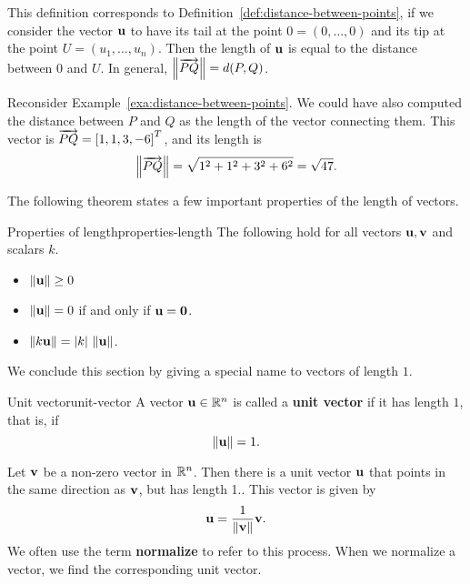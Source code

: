 This definition corresponds to
Definition~\ref{def:distance-between-points}, if we consider the
vector $\mbox{\bf u}$ to have its tail at the point
$0 = (0,\ldots,0)$ and its tip at the point
$U = (u_1,\ldots, u_n)$.  Then the length of $\mbox{\bf u}$ is equal
to the distance between $0$ and $U$. In general,
$\left\|\overrightarrow{PQ}\right\| = d(P,Q)$.

Reconsider Example~\ref{exa:distance-between-points}. We could have also
computed the distance between $P$ and $Q$ as the length of the vector
connecting them. This vector is $\overrightarrow{PQ} = \left[1,1,3,-6\right]^T$,
and its length is
\begin{equation*}
  \left\|\overrightarrow{PQ}\right\| = \sqrt{1^2+1^2+3^2+6^2} = \sqrt{47}.
\end{equation*}

The following theorem states a few important properties of the length
of vectors.

\begin{theorem}{Properties of length}{properties-length}
  The following hold for all vectors $\mbox{\bf u},\mbox{\bf v}$ and scalars $k$.
  \begin{itemize}
  \item $\left\|\mbox{\bf u}\right\|\geq 0$
  \item $\left\|\mbox{\bf u}\right\|=0$ if and only if $\mbox{\bf u}=\mbox{\bf 0}$.
  \item $\left\|k\mbox{\bf u}\right\| = |k|\,\left\|\mbox{\bf u}\right\|$.
  \end{itemize}
\end{theorem}

We conclude this section by giving a special name to vectors of length
$1$.

\begin{definition}{Unit vector}{unit-vector}
  A vector\/ $\mbox{\bf u}\in\mathbb{R}^n$ is called a
  \textbf{unit vector} if it has
  length $1$, that is, if
  \begin{equation*}
    \left\|\mbox{\bf u}\right\| = 1.
  \end{equation*}
\end{definition}

Let $\mbox{\bf v}$ be a non-zero vector in $\mathbb{R}^{n}$. Then there is a unit
vector $\mbox{\bf u}$ that points in the same direction as $\mbox{\bf v}$, but
has length 1.. This vector is
given by
\begin{equation*}
\mbox{\bf u} = \frac{1}{\left\|\mbox{\bf v}\right\|} \mbox{\bf v}.
\end{equation*}
We often use the term \textbf{normalize}
to refer to this process. When we normalize a vector, we find the
corresponding unit vector.

